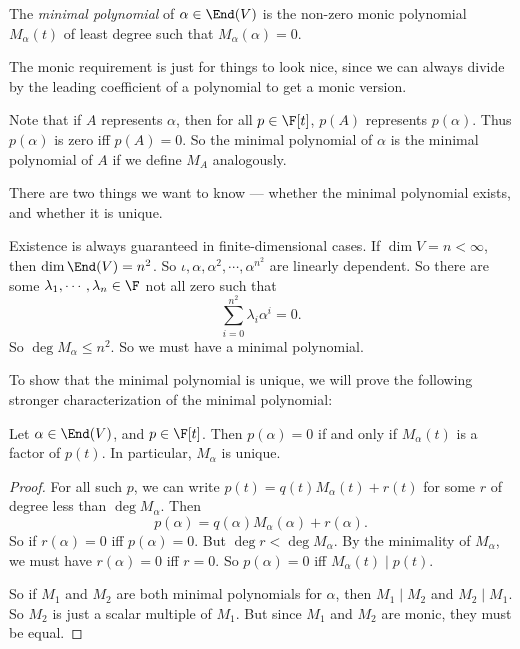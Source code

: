 \documentclass[a4paper]{article}
\begin{document}
\begin{defi}
  The \emph{minimal polynomial} of $\alpha \in \End(V)$ is the non-zero monic polynomial $M_\alpha(t)$ of least degree such that $M_\alpha(\alpha) = 0$.
\end{defi}
The monic requirement is just for things to look nice, since we can always divide by the leading coefficient of a polynomial to get a monic version.

Note that if $A$ represents $\alpha$, then for all $p \in \F[t]$, $p(A)$ represents $p(\alpha)$. Thus $p(\alpha)$ is zero iff $p(A) = 0$. So the minimal polynomial of $\alpha$ is the minimal polynomial of $A$ if we define $M_A$ analogously.

There are two things we want to know --- whether the minimal polynomial exists, and whether it is unique.

Existence is always guaranteed in finite-dimensional cases. If $\dim V = n < \infty$, then $\dim \End(V) = n^2$. So $\iota, \alpha, \alpha^2, \cdots, \alpha^{n^2}$ are linearly dependent. So there are some $\lambda_1, \cdots, \lambda_n \in \F$ not all zero such that
\[
  \sum_{i = 0}^{n^2} \lambda_i \alpha^i = 0.
\]
So $\deg M_\alpha \leq n^2$. So we must have a minimal polynomial.

To show that the minimal polynomial is unique, we will prove the following stronger characterization of the minimal polynomial:
\begin{lemma}
  Let $\alpha \in \End(V)$, and $p \in \F[t]$. Then $p(\alpha) = 0$ if and only if $M_\alpha(t)$ is a factor of $p(t)$. In particular, $M_\alpha$ is unique.
\end{lemma}

\begin{proof}
  For all such $p$, we can write $p(t) = q(t) M_\alpha(t) + r(t)$ for some $r$ of degree less than $\deg M_\alpha$. Then
  \[
    p(\alpha) = q(\alpha) M_\alpha(\alpha) + r(\alpha).
  \]
  So if $r(\alpha) = 0$ iff $p(\alpha) = 0$. But $\deg r < \deg M_\alpha$. By the minimality of $M_\alpha$, we must have $r(\alpha) = 0$ iff $r = 0$. So $p(\alpha) = 0$ iff $M_\alpha(t) \mid p(t)$.

  So if $M_1$ and $M_2$ are both minimal polynomials for $\alpha$, then $M_1 \mid M_2$ and $M_2 \mid M_1$. So $M_2$ is just a scalar multiple of $M_1$. But since $M_1$ and $M_2$ are monic, they must be equal.
\end{proof}
\end{document}
